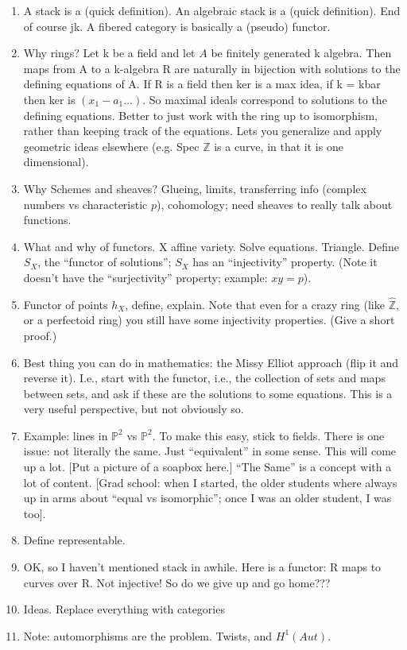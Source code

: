\documentclass[12pt]{article}
\newcommand{\Z}{{\mathbb Z}}
\begin{document}
\begin{enumerate}
\item  A stack is a (quick definition). An algebraic stack is a (quick definition). End of course jk. A fibered category is basically a (pseudo) functor. 

\item  Why rings? Let k be a field and let $A$ be finitely generated k algebra. Then maps from A to a k-algebra R are naturally in bijection with solutions to the defining equations of A. If R is a field then ker is a max idea, if k = kbar then ker is $(x_1-a_1...)$. So maximal ideals correspond to solutions to the defining equations. Better to just work with the ring up to isomorphism, rather than keeping track of the equations. Lets you generalize and apply geometric ideas elsewhere (e.g. Spec $\Z$ is a curve, in that it is one dimensional).

\item  Why Schemes and sheaves? Glueing, limits, transferring info (complex numbers vs characteristic $p$), cohomology; need sheaves to really talk about functions.

\item  What and why of functors. X affine variety. Solve equations. Triangle. Define $S_X$, the ``functor of solutions''; $S_X$ has an ``injectivity'' property. (Note it doesn’t have the ``surjectivity'' property; example: $xy = p$).

\item  Functor of points $h_X$, define, explain. Note that even for a crazy ring (like $\widehat{\Z}$, or a perfectoid ring) you still have some injectivity properties. (Give a short proof.)

\item  Best thing you can do in mathematics: the Missy Elliot approach (flip it and reverse it). I.e., start with the functor, i.e., the collection of sets and maps between sets, and ask if these are the solutions to some equations. This is a very useful perspective, but not obviously so. 

\item  Example: lines in $\mathbb{P}^2$ vs $\mathbb{P}^2$. To make this easy, stick to fields. There is one issue: not literally the same. Just ``equivalent'' in some sense. This will come up a lot. [Put a picture of a soapbox here.] ``The Same'' is a concept with a lot of content. [Grad school: when I started, the older students where always up in arms about ``equal vs isomorphic''; once I was an older student, I was too].

\item  Define representable. 

\item  OK, so I haven’t mentioned stack in awhile. Here is a functor: R maps to curves over R. Not injective! So do we give up and go home???

\item  Ideas. Replace everything with categories

\item  Note: automorphisms are the problem. Twists, and $H^1(Aut)$.
\end{enumerate}
\end{document}
